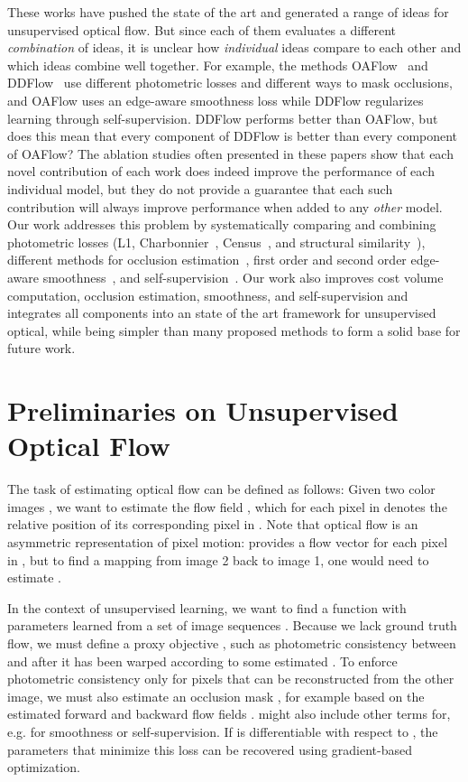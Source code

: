 \documentclass[runningheads]{llncs}
\begin{document}
These works have pushed the state of the art and generated a range of ideas for unsupervised optical flow. But since each of them evaluates a different \emph{combination} of ideas, it is unclear how \emph{individual} ideas compare to each other and which ideas combine well together. For example, the methods OAFlow~\cite{wang2018occlusion} and DDFlow~\cite{DDFlow} use different photometric losses and different ways to mask occlusions, and OAFlow uses an edge-aware smoothness loss while DDFlow regularizes learning through self-supervision. DDFlow performs better than OAFlow, but does this mean that every component of DDFlow is better than every component of OAFlow?
The ablation studies often presented in these papers show that each novel contribution of each work does indeed improve the performance of each individual model, but they do not provide a guarantee that each such contribution will always improve performance when added to any \emph{other} model.
Our work addresses this problem by systematically comparing and combining photometric losses (L1, Charbonnier~\cite{Sun2010}, Census~\cite{DDFlow,meister2018unflow,Zhong2019UnsupervisedDE,zou2018dfnet}, and structural similarity~\cite{ranjan2019cvpr,wang2018unos,yin2018geonet}), different methods for occlusion estimation~\cite{Brox04,wang2018occlusion}, first order and second order edge-aware smoothness~\cite{tomasi1998bilateral}, and self-supervision~\cite{DDFlow}. Our work also improves cost volume computation, occlusion estimation, smoothness, and self-supervision and integrates all components into an state of the art framework for unsupervised optical, while being simpler than many proposed methods to form a solid base for future work.

\section{Preliminaries on Unsupervised Optical Flow}

The task of estimating optical flow can be defined as follows: Given two color images , we want to estimate the flow field , which for each pixel in  denotes the relative position of its corresponding pixel in . Note that optical flow is an asymmetric representation of pixel motion:  provides a flow vector for each pixel in , but to find a mapping from image 2 back to image 1, one would need to estimate .

In the context of unsupervised learning, we want to find a function  with parameters  learned from a set of image sequences . Because we lack ground truth flow, we must define a proxy objective , such as photometric consistency between  and  after it has been warped according to some estimated . To enforce photometric consistency only for pixels that can be reconstructed from the other image, we must also estimate an occlusion mask , for example based on the estimated forward and backward flow fields .  might also include other terms for, e.g. for smoothness or self-supervision. If  is differentiable with respect to , the parameters that minimize this loss  can be recovered using gradient-based optimization.
\end{document}

